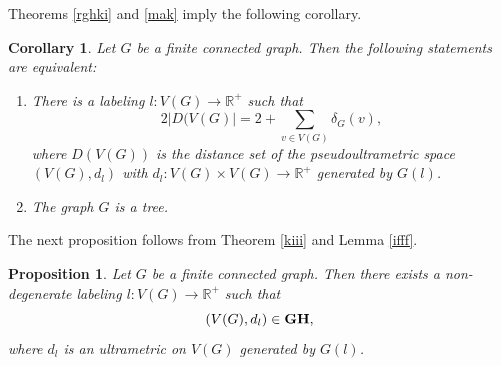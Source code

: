 \documentclass[pdflatex,sn-mathphys-num]{sn-jnl}%
\theoremstyle{thmstyleone}%
\newtheorem{Proposition}[Theorem]{Proposition}
\newtheorem{Corollary}[Theorem]{Corollary}
\theoremstyle{thmstyletwo}%
\theoremstyle{thmstylethree}%
\theoremstyle{thmstyletwo}%
\theoremstyle{thmstylethree}%
\begin{document}
Theorems \ref{rghki} and \ref{mak} imply the following corollary.

\begin{Corollary}\label{ter}
Let $G$ be a finite connected graph.
Then the following statements are equivalent:
\begin{enumerate}
    \item[(i)] There is a labeling $l : V(G) \to \mathbb{R}^+$ such that
\[
2|D(V(G)|= 2+\sum\limits_{v \in V(G)} \delta_G(v),
\]
where  $D(V(G))$ is the distance set of the pseudoultrametric space $(V(G), d_l)$ with $d_l : V(G)\times V(G) \to \mathbb R^+$ generated by $G(l)$.
\item[(ii)] The graph $G$ is a tree.
\end{enumerate}
\end{Corollary}



The next proposition follows from Theorem \ref{kiii} and Lemma \ref{ifff}. 

\begin{Proposition}\label{lero}
Let $G$ be a finite connected graph. Then there exists a non-degenerate labeling 
\(
l : V(G) \to \mathbb{R}^+
\)
such that 
\begin{equation}
    \label{uutt-1}
    (V(G), d_{l}) \in {\bf GH},
\end{equation}
where $d_{l}$ is an ultrametric on $V(G)$ generated by $G(l)$.
\end{Proposition}
\end{document}
